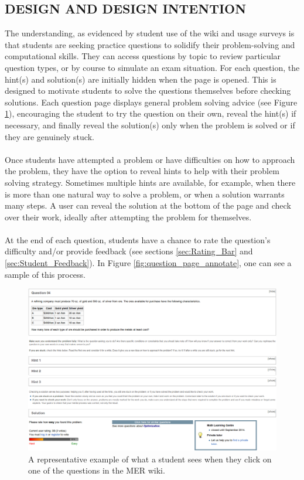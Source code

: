 \documentclass{primus}
\begin{document}
\subsection{DESIGN AND DESIGN INTENTION}\label{sec:Design_and_Design_Intention}
The understanding, as evidenced by student use of the wiki and usage surveys is that students are seeking practice questions to solidify their problem-solving and computational skills. They can access questions by topic to review particular question types, or by course to simulate an exam situation. For each question, the hint(s) and solution(s) are initially hidden when the page is opened. This is designed to motivate students to solve the questions themselves before checking solutions. Each question page displays general problem solving advice (see Figure \ref{fig:question_page}), encouraging the student to try the question on their own, reveal the hint(s) if necessary, and finally reveal the solution(s) only when the problem is solved or if they are genuinely stuck.
\\\\
\noindent{}Once students have attempted a problem or have difficulties on how to approach the problem, they have the option to reveal hints to help with their problem solving strategy. Sometimes multiple hints are available, for example, when there is more than one natural way to solve a problem, or when a solution warrants many steps. A user can reveal the solution at the bottom of the page and check over their work, ideally after attempting the problem for themselves.
\\\\
\noindent{}At the end of each question, students have a chance to rate the question’s difficulty and/or provide feedback (see sections \ref{sec:Rating_Bar} and \ref{sec:Student_Feedback}). In Figure \ref{fig:question_page_annotate}, one can see a sample of this process.
\begin{figure}[H]
\centering
\includegraphics[width=\textwidth]{figs/Question_Page.png}
\caption{A representative example of what a student sees when they click on one of the questions in the MER wiki.}\label{fig:question_page}
\end{figure}
\end{document}
